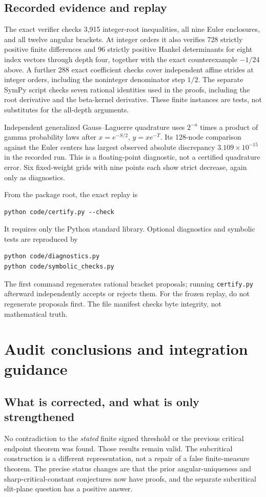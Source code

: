 \documentclass[11pt]{article}
\numberwithin{equation}{section}
\theoremstyle{definition}
\theoremstyle{remark}
\begin{document}
\subsection{Recorded evidence and replay}
The exact verifier checks 3,915 integer-root inequalities, all nine
Euler enclosures, and all twelve angular brackets. At integer orders
it also verifies 728 strictly positive finite differences and 96
strictly positive Hankel determinants for eight index vectors through
depth four, together with the exact counterexample $-1/24$ above.
A further 288 exact coefficient checks cover independent affine strides
at integer orders, including the noninteger denominator step $1/2$.
The separate SymPy script checks seven rational identities used in
the proofs, including the root derivative and the beta-kernel derivative.
These finite instances are tests, not substitutes for the all-depth
arguments.

Independent generalized Gauss--Laguerre quadrature uses
$2^{-a}$ times a product of gamma probability laws after
$x=e^{-S/2}$, $y=xe^{-T}$. Its 128-node comparison against the Euler
centers has largest observed absolute discrepancy
$3.109\times10^{-15}$ in the recorded run. This is a floating-point
diagnostic, not a certified quadrature error. Six fixed-weight grids
with nine points each show strict decrease, again only as diagnostics.

From the package root, the exact replay is
\begin{verbatim}
python code/certify.py --check
\end{verbatim}
It requires only the Python standard library. Optional diagnostics and
symbolic tests are reproduced by
\begin{verbatim}
python code/diagnostics.py
python code/symbolic_checks.py
\end{verbatim}
The first command regenerates rational bracket proposals; running
\texttt{certify.py} afterward independently accepts or rejects them.
For the frozen replay, do not regenerate proposals first.
The file manifest checks byte integrity, not mathematical truth.

\section{Audit conclusions and integration guidance}
\label{sec:audit}
\subsection{What is corrected, and what is only strengthened}
No contradiction to the \emph{stated} finite signed threshold or the
previous critical endpoint theorem was found. Those results remain
valid. The subcritical construction is a different representation, not
a repair of a false finite-measure theorem. The precise status changes
are that the prior angular-uniqueness and sharp-critical-constant
conjectures now have proofs, and the separate subcritical slit-plane
question has a positive answer.
\end{document}
